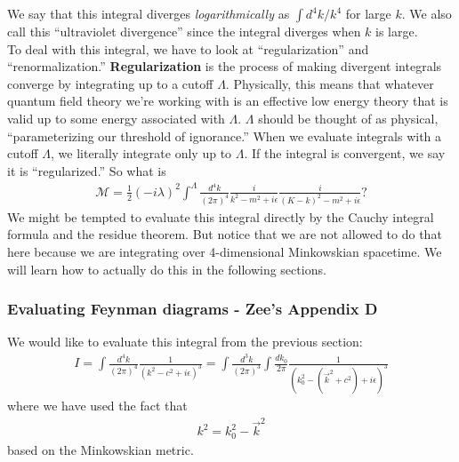 \documentclass{book}
\theoremstyle{definition}
\newcommand{\f}[2]{\frac{#1}{#2}}
\begin{document}
We say that this integral diverges \textit{logarithmically} as $\int d^4k/k^4$ for large $k$. We also call this ``ultraviolet divergence'' since the integral diverges when $k$ is large. \\

To deal with this integral, we have to look at ``regularization'' and ``renormalization.'' \textbf{Regularization} is the process of making divergent integrals converge by integrating up to a cutoff $\Lambda$. Physically, this means that whatever quantum field theory we're working with is an effective low energy theory that is valid up to some energy associated with $\Lambda$.  $\Lambda$ should be thought of as physical, ``parameterizing our threshold of ignorance.'' When we evaluate integrals with a cutoff $\Lambda$, we literally integrate only up to $\Lambda$. If the integral is convergent, we say it is ``regularized.'' So what is
\begin{align}
\mathcal{M} = \f{1}{2}(-i\lambda)^2\int^\Lambda \f{d^4k}{(2\pi)^4}\f{i}{k^2 - m^2 + i\epsilon}\f{i}{(K - k)^2 - m^2 + i\epsilon}?
\end{align}
We might be tempted to evaluate this integral directly by the Cauchy integral formula and the residue theorem. But notice that we are not allowed to do that here because we are integrating over 4-dimensional Minkowskian spacetime. We will learn how to actually do this in the following sections.


\subsubsection{Evaluating Feynman diagrams - Zee's Appendix D}

We would like to evaluate this integral from the previous section:
\begin{align}
\boxed{I = \int \f{d^4k}{(2\pi)^4} \f{1}{(k^2 - c^2+ i\epsilon)^3} = \int \f{d^3k}{(2\pi)^3}\int \f{dk_0}{2\pi} \f{1}{(k_0^2 - (\vec{k}^2 + c^2)+ i\epsilon)^3}} 
\end{align}
where we have used the fact that
\begin{align}
k^2 = k_0^2 - \vec{k}^2
\end{align}
based on the Minkowskian metric. \\
\end{document}
